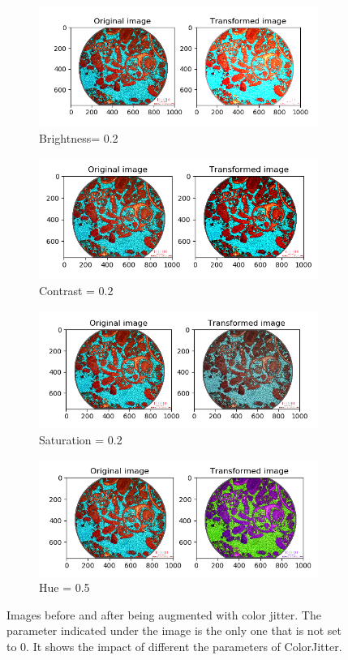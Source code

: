 \begin{itemize}
\begin{figure}
\begin{subfigure}{.5\textwidth}
  \centering
  \includegraphics[width=.8\linewidth]{figures/03-bightness08.PNG}
  \caption{Brightness= 0.2}
  \label{fig:brightness}
\end{subfigure}%
\begin{subfigure}{.5\textwidth}
  \centering
  \includegraphics[width=.8\linewidth]{figures/03-contrast1.PNG}
  \caption{Contrast = 0.2}
  \label{fig:contrast}
\end{subfigure}
\begin{subfigure}{.5\textwidth}
  \centering
  \includegraphics[width=.8\linewidth]{figures/03-saturation0.PNG}
  \caption{Saturation = 0.2}
  \label{fig:saturation}
\end{subfigure}%
\begin{subfigure}{.5\textwidth}
  \centering
  \includegraphics[width=.8\linewidth]{figures/03-hue05.PNG}
  \caption{Hue = 0.5}
  \label{fig:hue}
\end{subfigure}
\caption{Images before and after being augmented with color jitter. The parameter indicated under the image is the only one that is not set to 0. It shows the impact of different the parameters of ColorJitter.}
\label{fig:colorjitter}
\end{figure}


\end{itemize}
